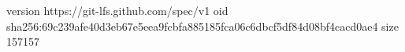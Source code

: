 version https://git-lfs.github.com/spec/v1
oid sha256:69c239afe40d3eb67e5eea9fcbfa885185fca06c6dbcf5df84d08bf4cacd0ae4
size 157157
